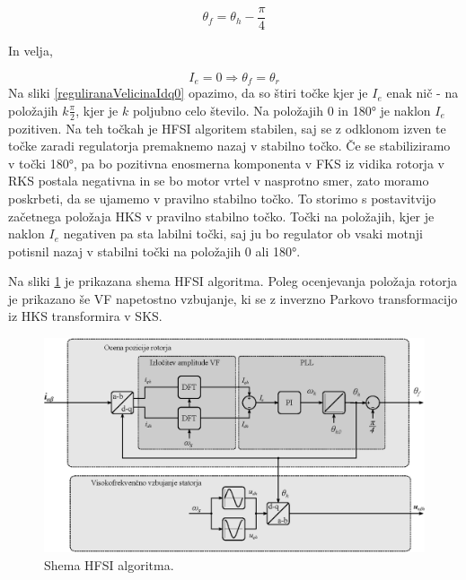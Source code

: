 \documentclass[a4paper,twoside,openright,12pt,slovene]{book}
\begin{document}
\begin{equation}
    \theta_{f} = \theta_{h} - \frac{\pi}{4}
\end{equation}

In velja,

\begin{equation}
    I_e = 0 \Rightarrow \theta_{f} = \theta_{r}
\end{equation}
Na sliki \ref{reguliranaVelicinaIdq0} opazimo, da so štiri točke kjer je $I_e$ enak nič - na položajih $k\frac{\pi}{2}$, kjer je $k$ poljubno celo število. Na položajih 0 in 180° je naklon $I_e$
pozitiven. Na teh točkah je HFSI algoritem stabilen, saj se z odklonom izven te točke zaradi regulatorja premaknemo nazaj v stabilno točko. Če se stabiliziramo v točki 180°, pa bo pozitivna enosmerna
komponenta v FKS iz vidika rotorja v RKS postala negativna in se bo motor vrtel v nasprotno smer, zato moramo poskrbeti, da se ujamemo v pravilno stabilno točko. To storimo s postavitvijo začetnega položaja HKS
v pravilno stabilno točko. Točki na položajih, kjer je naklon $I_e$ negativen pa sta labilni točki, saj ju bo regulator ob vsaki motnji potisnil nazaj v stabilni točki na položajih 0 ali 180°.

\newpage
Na sliki \ref{HFSIsimple} je prikazana shema HFSI algoritma. Poleg ocenjevanja položaja rotorja je prikazano še VF napetostno vzbujanje, ki se z inverzno Parkovo transformacijo iz HKS transformira v
SKS.

\begin{figure}[!htbp]
    \centering
    \includegraphics[width=0.9\columnwidth]{Slike/Inkscape/HFSIsimple.eps}
    \caption{\label{HFSIsimple} Shema HFSI algoritma.}
\end{figure}

\newpage

\end{document}
